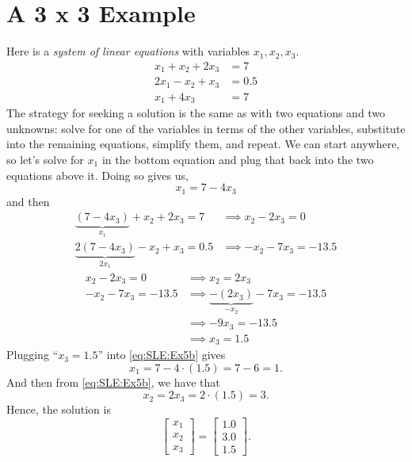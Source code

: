 \section{A 3 x 3 Example}
Here is a \textit{system of linear equations} with variables $x_1, x_2, x_3$. 
\begin{equation}
\label{eq:SLE:Ex5}
\begin{aligned}
x_1+x_2+2x_3 &=7 \\
2x_1-x_2+x_3&=0.5\\
x_1 + 4 x_3 &=7
\end{aligned}
\end{equation}
The strategy for seeking a solution is the same as with two equations and two unknowns: solve for one of the variables in terms of the other variables, substitute into the remaining equations, simplify them, and repeat. We can start anywhere, so let's solve for $x_1$ in the bottom equation and plug that back into the two equations above it. Doing so gives us,
\begin{equation}
\label{eq:SLE:Ex5b}
   x_1 = 7 - 4 x_3 
\end{equation}
and then 
\begin{align*}
\underbrace{( 7 - 4x_3)}_{x_1} +x_2+ 2x_3 =7 & \implies x_2  - 2 x_3 = 0 \\
\underbrace{2( 7 - 4x_3)}_{2 x_1}-x_2+x_3=0.5 & \implies -x_2 -7 x_3 = -13.5
\end{align*}
\begin{align}
\label{eq:SLE:Ex5c}
 x_2  - 2 x_3 = 0 &\implies x_2 = 2 x_3\\
 -x_2 -7 x_3 = -13.5 & \implies \underbrace{-(2 x_3)}_{-x_2}-7x_3 = -13.5 \nonumber \\
 & \implies - 9 x_3 = -13.5  \nonumber\\
 &\implies x_3 = 1.5 \nonumber
\end{align}
Plugging ``$x_3=1.5$'' into \eqref{eq:SLE:Ex5b} gives $$x_1=7-4\cdot (1.5)=7-6=1.$$ 
And then from \eqref{eq:SLE:Ex5b}, we have that
$$x_2 = 2 x_3 = 2 \cdot (1.5) = 3. $$
Hence, the solution is
\begin{equation}
    \begin{bmatrix} x_1 \\ x_2 \\ x_3 \end{bmatrix} = \left[\begin{array}{l}
1.0 \\ 3.0 \\ 1.5
\end{array}  \right].
\end{equation}

